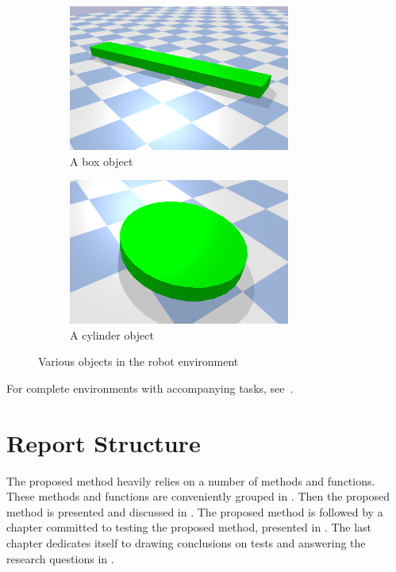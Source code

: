 \begin{figure}[H]
    \centering
    \begin{subfigure}{.5\textwidth}
    \centering
    \includegraphics[width=0.8\textwidth]{figures/box_object.png}
    \caption{A box object}
    \end{subfigure}%
    \begin{subfigure}{.5\textwidth}
    \centering
    \includegraphics[width=0.8\textwidth]{figures/cylinder_object.png}
    \caption{A cylinder object}
    \end{subfigure}%
    \caption{Various objects in the robot environment}%
    \label{fig:example_objects}
\end{figure}

For complete environments with accompanying tasks, see~.\bs

\section{Report Structure}%
\label{sec:report_structure}
The proposed method heavily relies on a number of methods and functions. These methods and functions are conveniently grouped in . Then the proposed method is presented and discussed in . The proposed method is followed by a chapter committed to testing the proposed method, presented in . The last chapter dedicates itself to drawing conclusions on tests and answering the research questions in .\bs
